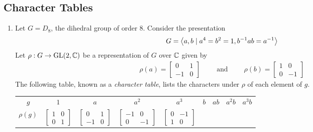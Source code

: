 \subsection{Character Tables}

\begin{boxexample} \hfill
    \begin{enumerate}
        \item Let $G = D_8$, the dihedral group of order $8$. Consider the presentation
        \begin{align*}
            G = \left\langle a, b \mid a^4 = b^2 = 1, b^{-1} a b = a^{-1} \right\rangle
        \end{align*}
        Let $\rho : G \to \operatorname{GL}\!\left( 2, \mathbb{C} \right)$ be a representation of $G$ over $\mathbb{C}$ given by
        \begin{align*}
            \rho(a) = \begin{bmatrix}
                0 & 1 \\ -1 & 0
            \end{bmatrix}
            \quad\quad \text{ and } \quad\quad
            \rho(b) = \begin{bmatrix}
                1 & 0 \\ 0 & -1
            \end{bmatrix}
        \end{align*}
        The following table, known as a \textit{character table}, lists the characters under $\rho$ of each element of $g$.
        \begin{table}[H]
            \centering
            \begin{tabular}{|c||c|c|c|c|c|c|c|c|}
                \hline
                $g$ & $1$ & $a$ & $a^2$ & $a^3$ & $b$ & $ab$ & $a^2 b$ & $a^3 b$ \\
                $\rho(g)$ &
                $\begin{bmatrix} 1 & 0 \\ 0 & 1 \end{bmatrix}$
                &
                $\begin{bmatrix} 0 & 1 \\ -1 & 0 \end{bmatrix}$
                &
                $\begin{bmatrix} -1 & 0 \\ 0 & -1 \end{bmatrix}$
                &
                $\begin{bmatrix} 0 & -1 \\ 1 & 0 \end{bmatrix}$

\end{tabular}
\end{table}
\end{enumerate}
\end{boxexample}
